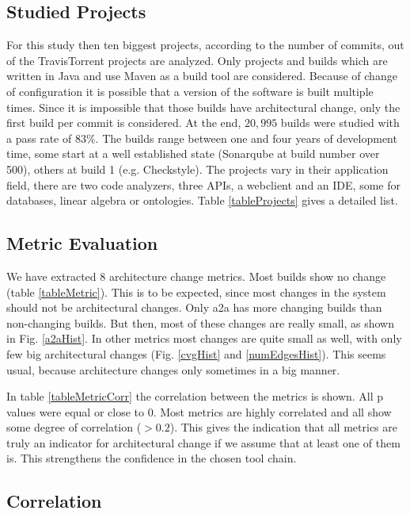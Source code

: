 \documentclass[conference]{IEEEtran}
\begin{document}
\subsection{Studied Projects}

For this study then ten biggest projects, according to the number of commits, out of the TravisTorrent projects are analyzed. Only projects and builds which are written in Java and use Maven as a build tool are considered. Because of change of configuration it is possible that a version of the software is built multiple times. Since it is impossible that those builds have architectural change, only the first build per commit is considered. At the end, $20,995$ builds were studied with a pass rate of $83\%$. The builds range between one and four years of development time, some start at a well established state (Sonarqube at build number over 500), others at build 1 (e.g. Checkstyle). The projects vary in their application field, there are two code analyzers, three APIs, a webclient and an IDE, some for databases, linear algebra or ontologies. Table \ref{tableProjects} gives a detailed list.

\subsection{Metric Evaluation}



We have extracted 8 architecture change metrics. Most builds show no change (table \ref{tableMetric}). This is to be expected, since most changes in the system should not be architectural changes. 
Only a2a has more changing builds than non-changing builds. But then, most of these changes are really small, as shown in Fig. \ref{a2aHist}. In other metrics most changes are quite small as well, with only few big architectural changes (Fig. \ref{cvgHist} and \ref{numEdgesHist}). This seems usual, because architecture changes only sometimes in a big manner.

In table \ref{tableMetricCorr} the correlation between the metrics is shown. All p values were equal or close to 0. Most metrics are highly correlated and all show some degree of correlation ($>0.2$). This gives the indication that all metrics are truly an indicator for architectural change if we assume that at least one of them is. This strengthens the confidence in the chosen tool chain. 

\subsection{Correlation}
\end{document}
